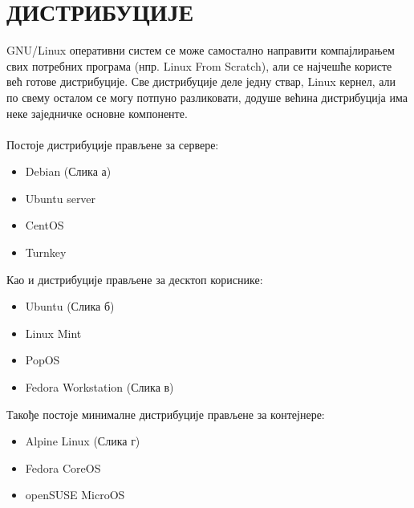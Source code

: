 \documentclass[a4paper,14pt]{article}
\begin{document}
\section{ДИСТРИБУЦИЈЕ}
GNU/Linux оперативни систем се може самостално направити компајлирањем свих потребних програма (нпр. Linux From Scratch), али се најчешће користе већ готове дистрибуције. Све дистрибуције деле једну ствар, Linux кернел, али по свему осталом се могу потпуно разликовати, додуше већина дистрибуција има неке заједничке основне компоненте.
\\\\
Постоје дистрибуције прављене за сервере:
\begin{itemize}
\item Debian (Слика а)
\item Ubuntu server
\item CentOS
\item Turnkey
\end{itemize}
Као и дистрибуције прављене за десктоп кориснике:
\begin{itemize}
\item Ubuntu (Слика б)
\item Linux Mint
\item PopOS
\item Fedora Workstation (Слика в)
\end{itemize}
Такође постоје минималне дистрибуције прављене за контејнере:
\begin{itemize}
\item Alpine Linux (Слика г)
\item Fedora CoreOS
\item openSUSE MicroOS
\end{itemize}
\end{document}
